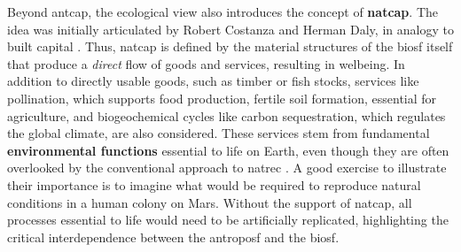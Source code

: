 \documentclass[./main_en.tex]{subfiles}
\begin{document}
\par Beyond \gls{antcap}, the ecological view also introduces the concept of \textbf{\gls{natcap}}. The idea was initially articulated by Robert Costanza and Herman Daly, in \gls{analogy} to built capital \cite{Costanza1992a}. Thus, \gls{natcap} is defined by the material structures of the \gls{biosf} itself that produce a \textit{direct} flow of goods and services, resulting in \gls{welbeing}. In addition to directly usable goods, such as timber or fish stocks, services like pollination, which supports food production, fertile soil formation, essential for agriculture, and biogeochemical cycles like carbon sequestration, which regulates the global climate, are also considered. These services stem from fundamental \textbf{environmental functions} essential to life on Earth, even though they are often overlooked by the conventional approach to \gls{natrec} \cite{Groot1987a}. A good exercise to illustrate their importance is to imagine what would be required to reproduce natural conditions in a human colony on Mars. Without the support of \gls{natcap}, all processes essential to life would need to be artificially replicated, highlighting the critical interdependence between the \gls{antroposf} and the \gls{biosf}.
\end{document}
